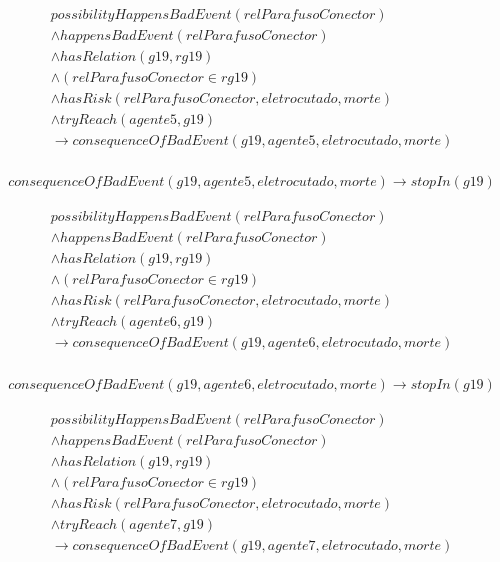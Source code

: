 \begin{eqnarray}\nonumber
    possibilityHappensBadEvent(relParafusoConector) \nonumber \\
    \wedge happensBadEvent(relParafusoConector) \nonumber \\ 
    \wedge hasRelation(g19,rg19)  \nonumber \\  
    \wedge (relParafusoConector \in rg19) \nonumber \\ 
    \wedge hasRisk(relParafusoConector,eletrocutado,morte) \nonumber \\  
    \wedge tryReach(agente5,g19) \nonumber \\ 
    \to consequenceOfBadEvent(g19,agente5,eletrocutado,morte) \\ \nonumber
\end{eqnarray}

\begin{eqnarray}
	consequenceOfBadEvent(g19,agente5,eletrocutado,morte) \to stopIn(g19)
\end{eqnarray}

\begin{eqnarray}\nonumber
   possibilityHappensBadEvent(relParafusoConector) \nonumber \\
    \wedge happensBadEvent(relParafusoConector) \nonumber \\ 
    \wedge hasRelation(g19,rg19)  \nonumber \\  
    \wedge (relParafusoConector \in rg19) \nonumber \\ 
    \wedge hasRisk(relParafusoConector,eletrocutado,morte) \nonumber \\  
    \wedge tryReach(agente6,g19) \nonumber \\ 
    \to consequenceOfBadEvent(g19,agente6,eletrocutado,morte) \\ \nonumber
\end{eqnarray}

\begin{eqnarray}
	consequenceOfBadEvent(g19,agente6,eletrocutado,morte) \to stopIn(g19)
\end{eqnarray}

\begin{eqnarray}\nonumber
   possibilityHappensBadEvent(relParafusoConector) \nonumber \\
    \wedge happensBadEvent(relParafusoConector) \nonumber \\ 
    \wedge hasRelation(g19,rg19)  \nonumber \\  
    \wedge (relParafusoConector \in rg19) \nonumber \\ 
    \wedge hasRisk(relParafusoConector,eletrocutado,morte) \nonumber \\  
    \wedge tryReach(agente7,g19) \nonumber \\ 
    \to consequenceOfBadEvent(g19,agente7,eletrocutado,morte) \\ \nonumber
\end{eqnarray}

